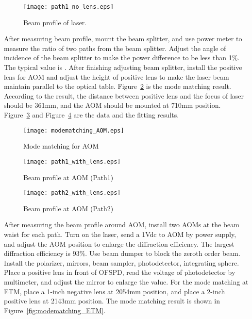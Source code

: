 \begin{figure}
	\begin{center}
		\texttt{[image: path1\_no\_lens.eps]}
		\caption{Beam profile of laser.} 
		\label{fig:beam_profile} 
	\end{center}
\end{figure}

After measuring beam profile, mount the beam splitter, and use power meter to measure the ratio of two paths from the beam splitter. Adjust the angle of incidence of the beam splitter to make the power difference to be less than 1$\%$. The typical value is \underline{\qquad\qquad}. After finishing adjusting beam splitter, install the positive lens for AOM and adjust the height of positive lens to make the laser beam maintain parallel to the optical table. Figure~\ref{fig:modematching_AOM} is the mode matching result. According to the result, the distance between positive lens and the focus of laser should be 361mm, and the AOM should be mounted at 710mm position. Figure~\ref{fig:beamprofile_AOM1} and Figure~\ref{fig:beamprofile_AOM2} are the data and the fitting results.

\begin{figure}
	\begin{center}
		\texttt{[image: modematching\_AOM.eps]}
		\caption{Mode matching for AOM} 
		\label{fig:modematching_AOM} 
	\end{center}
\end{figure}

\begin{figure}
	\begin{center}
		\texttt{[image: path1\_with\_lens.eps]}
		\caption{Beam profile at AOM (Path1)} 
		\label{fig:beamprofile_AOM1} 
	\end{center}
\end{figure}

\begin{figure}
	\begin{center}
		\texttt{[image: path2\_with\_lens.eps]}
		\caption{Beam profile at AOM (Path2)} 
		\label{fig:beamprofile_AOM2} 
	\end{center}
\end{figure}


After measuring the beam profile around AOM, install two AOMs at the beam waist for each path. Turn on the laser, send a 1Vdc to AOM by power supply, and adjust the AOM position to enlarge the diffraction efficiency. The largest diffraction efficiency is 93$\%$. Use beam dumper to block the zeroth order beam. Install the polarizer, mirrors, beam sampler, photodetector, integrating sphere. Place a positive lens in front of OFSPD, read the voltage of photodetector by multimeter, and adjust the mirror to enlarge the value. For the mode matching at ETM, place a 1-inch negative lens at 2054mm position, and place a 2-inch positive lens at 2143mm position. The mode matching result is shown in Figure~\ref{fig:modematching_ETM}.



